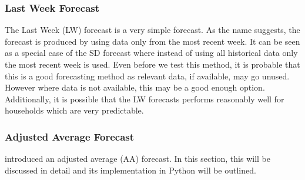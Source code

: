 \documentclass[a4paper]{article}
\begin{document}
\subsubsection{Last Week Forecast} \label{subsubsec:lwforecast}
The Last Week (LW) forecast is a very simple forecast. As the name suggests, the forecast is produced by using data only from the most recent week. It can be seen as a special case of the SD forecast where instead of using all historical data only the most recent week is used. Even before we test this method, it is probable that this is a good forecasting method as relevant data, if available, may go unused. However where data is not available, this may be a good enough option. Additionally, it is possible that the LW forecasts performs reasonably well for households which are very predictable.

\subsubsection{Adjusted Average Forecast} \label{subsubsec:AAforecast}
\cite{dan14} introduced an adjusted average (AA) forecast. In this section, this will be discussed in detail and its implementation in Python will be outlined.
\end{document}
